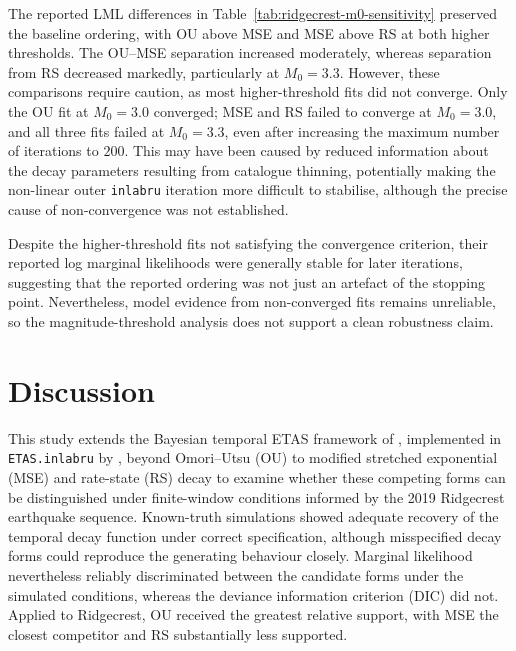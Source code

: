 \documentclass{statsmsc}
\begin{document}
The reported LML differences in Table~\ref{tab:ridgecrest-m0-sensitivity} preserved the baseline ordering, with OU above MSE and MSE above RS at both higher thresholds. The OU--MSE separation increased moderately, whereas separation from RS decreased markedly, particularly at $M_0 =3.3$. However, these comparisons require caution, as most higher-threshold fits did not converge. Only the OU fit at $M_0 =3.0$ converged; MSE and RS failed to converge at $M_0 = 3.0$, and all three fits failed at $M_0 =3.3$, even after increasing the maximum number of iterations to $200$. This may have been caused by reduced information about the decay parameters resulting from catalogue thinning, potentially making the non-linear outer \texttt{inlabru} iteration more difficult to stabilise, although the precise cause of non-convergence was not established.

Despite the higher-threshold fits not satisfying the convergence criterion, their reported log marginal likelihoods were generally stable for later iterations, suggesting that the reported ordering was not just an artefact of the stopping point. Nevertheless, model evidence from non-converged fits remains unreliable, so the magnitude-threshold analysis does not support a clean robustness claim.

\section{Discussion} \label{sec:discussion}

This study extends the Bayesian temporal ETAS framework of \citet{serafini2023approximation}, implemented in \texttt{ETAS.inlabru} by \citet{naylor2023bayesian}, beyond Omori--Utsu (OU) to modified stretched exponential (MSE) and rate-state (RS) decay to examine whether these competing forms can be distinguished under finite-window conditions informed by the 2019 Ridgecrest earthquake sequence. Known-truth simulations showed adequate recovery of the temporal decay function under correct specification, although misspecified decay forms could reproduce the generating behaviour closely. Marginal likelihood nevertheless reliably discriminated between the candidate forms under the simulated conditions, whereas the deviance information criterion (DIC) did not. Applied to Ridgecrest, OU received the greatest relative support, with MSE the closest competitor and RS substantially less supported. 
\end{document}
